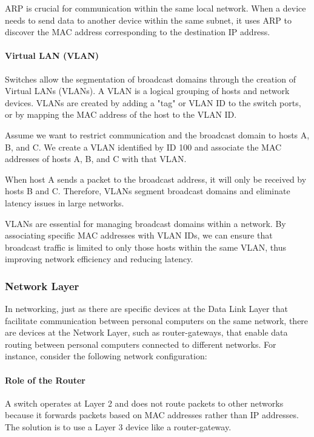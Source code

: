 ARP is crucial for communication within the same local network. When a device needs to send data to another device within the same subnet, it uses ARP to discover the MAC address corresponding to the destination IP address.

\paragraph{Virtual LAN (VLAN)}
Switches allow the segmentation of broadcast domains through the creation of Virtual LANs (VLANs). A VLAN is a logical grouping of hosts and network devices. VLANs are created by adding a "tag" or VLAN ID to the switch ports, or by mapping the MAC address of the host to the VLAN ID.

Assume we want to restrict communication and the broadcast domain to hosts A, B, and C. We create a VLAN identified by ID 100 and associate the MAC addresses of hosts A, B, and C with that VLAN.

When host A sends a packet to the broadcast address, it will only be received by hosts B and C. Therefore, VLANs segment broadcast domains and eliminate latency issues in large networks.


VLANs are essential for managing broadcast domains within a network. By associating specific MAC addresses with VLAN IDs, we can ensure that broadcast traffic is limited to only those hosts within the same VLAN, thus improving network efficiency and reducing latency.


\subsubsection{\textbf{Network Layer}}
In networking, just as there are specific devices at the Data Link Layer that facilitate communication between personal computers on the same network, there are devices at the Network Layer, such as router-gateways, that enable data routing between personal computers connected to different networks. For instance, consider the following network configuration:

\paragraph{Role of the Router}
A switch operates at Layer 2 and does not route packets to other networks because it forwards packets based on MAC addresses rather than IP addresses. The solution is to use a Layer 3 device like a router-gateway.

